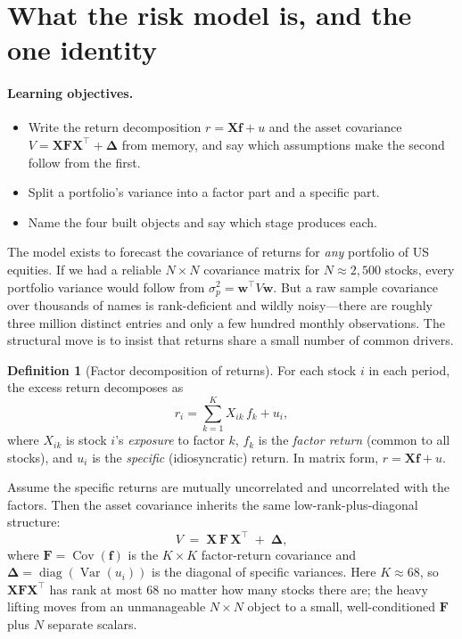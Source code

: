 \documentclass[11pt]{article}
\theoremstyle{definition}
\newtheorem{definition}{Definition}[section]
\theoremstyle{plain}
\theoremstyle{remark}
\DeclareMathOperator{\Var}{Var}
\DeclareMathOperator{\Cov}{Cov}
\DeclareMathOperator{\diag}{diag}
\newcommand{\T}{^{\!\top}}
\newcommand{\wvec}{\mathbf{w}}
\newcommand{\Xmat}{\mathbf{X}}
\newcommand{\Fmat}{\mathbf{F}}
\newcommand{\Del}{\boldsymbol{\Delta}}
\newcommand{\fvec}{\mathbf{f}}
\begin{document}
\tableofcontents
\bigskip

\section{What the risk model is, and the one identity}\label{sec:goal}

\paragraph{Learning objectives.}
\begin{itemize}[leftmargin=1.4em,nosep]
  \item Write the return decomposition $r = \Xmat\fvec + u$ and the asset covariance $V = \Xmat\Fmat\Xmat\T + \Del$ from memory, and say which assumptions make the second follow from the first.
  \item Split a portfolio's variance into a factor part and a specific part.
  \item Name the four built objects and say which stage produces each.
\end{itemize}

The model exists to forecast the covariance of returns for \emph{any} portfolio of US equities. If we had a reliable $N\times N$ covariance matrix for $N\approx 2{,}500$ stocks, every portfolio variance would follow from $\sigma_p^2 = \wvec\T V \wvec$. But a raw sample covariance over thousands of names is rank-deficient and wildly noisy---there are roughly three million distinct entries and only a few hundred monthly observations. The structural move is to insist that returns share a small number of common drivers.

\begin{definition}[Factor decomposition of returns]
For each stock $i$ in each period, the excess return decomposes as
\[
  r_i = \sum_{k=1}^{K} X_{ik}\, f_k + u_i,
\]
where $X_{ik}$ is stock $i$'s \emph{exposure} to factor $k$, $f_k$ is the \emph{factor return} (common to all stocks), and $u_i$ is the \emph{specific} (idiosyncratic) return. In matrix form, $r = \Xmat\fvec + u$.
\end{definition}

Assume the specific returns are mutually uncorrelated and uncorrelated with the factors. Then the asset covariance inherits the same low-rank-plus-diagonal structure:
\[
  V \;=\; \Xmat\,\Fmat\,\Xmat\T \;+\; \Del,
\]
where $\Fmat = \Cov(\fvec)$ is the $K\times K$ factor-return covariance and $\Del = \diag(\Var(u_i))$ is the diagonal of specific variances. Here $K\approx 68$, so $\Xmat\Fmat\Xmat\T$ has rank at most $68$ no matter how many stocks there are; the heavy lifting moves from an unmanageable $N\times N$ object to a small, well-conditioned $\Fmat$ plus $N$ separate scalars.
\end{document}
